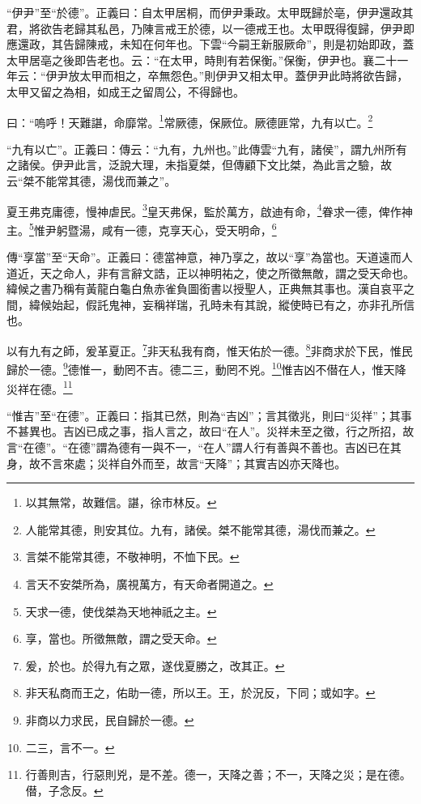 {\noindent\shu{}\fzkt “伊尹”至“於德”。正義曰：自太甲居桐，而伊尹秉政。太甲既歸於亳，伊尹還政其君，將欲告老歸其私邑，乃陳言戒王於德，以一德戒王也。太甲既得復歸，伊尹即應還政，其告歸陳戒，未知在何年也。下雲“今嗣王新服厥命”，則是初始即政，蓋太甲居亳之後即告老也。云：“在太甲，時則有若保衡。”保衡，伊尹也。襄二十一年云：“伊尹放太甲而相之，卒無怨色。”則伊尹又相太甲。蓋伊尹此時將欲告歸，太甲又留之為相，如成王之留周公，不得歸也。 \par}

曰：“嗚呼！天難諶，命靡常。\footnote{以其無常，故難信。諶，徐巿林反。}常厥德，保厥位。厥德匪常，九有以亡。\footnote{人能常其德，則安其位。九有，諸侯。桀不能常其德，湯伐而兼之。}

{\noindent\shu{}\fzkt “九有以亡”。正義曰：傳云：“九有，九州也。”此傳雲“九有，諸侯”，謂九州所有之諸侯。伊尹此言，泛說大理，未指夏桀，但傳顧下文比桀，為此言之驗，故云“桀不能常其德，湯伐而兼之”。 \par}

夏王弗克庸德，慢神虐民。\footnote{言桀不能常其德，不敬神明，不恤下民。}皇天弗保，監於萬方，啟迪有命，\footnote{言天不安桀所為，廣視萬方，有天命者開道之。}眷求一德，俾作神主。\footnote{天求一德，使伐桀為天地神祇之主。}惟尹躬暨湯，咸有一德，克享天心，受天明命，\footnote{享，當也。所徵無敵，謂之受天命。}

{\noindent\zhuan{}\fzbyks 傳“享當”至“天命”。正義曰：德當神意，神乃享之，故以“享”為當也。天道遠而人道近，天之命人，非有言辭文誥，正以神明祐之，使之所徵無敵，謂之受天命也。緯候之書乃稱有黃龍白龜白魚赤雀負圖銜書以授聖人，正典無其事也。漢自哀平之間，緯候始起，假託鬼神，妄稱祥瑞，孔時未有其說，縱使時已有之，亦非孔所信也。 \par}

以有九有之師，爰革夏正。\footnote{爰，於也。於得九有之眾，遂伐夏勝之，改其正。}非天私我有商，惟天佑於一德。\footnote{非天私商而王之，佑助一德，所以王。王，於況反，下同；或如字。}非商求於下民，惟民歸於一德。\footnote{非商以力求民，民自歸於一德。}德惟一，動罔不吉。德二三，動罔不兇。\footnote{二三，言不一。}惟吉凶不僣在人，惟天降災祥在德。\footnote{行善則吉，行惡則兇，是不差。德一，天降之善；不一，天降之災；是在德。僣，子念反。}

{\noindent\shu{}\fzkt “惟吉”至“在德”。正義曰：指其已然，則為“吉凶”；言其徵兆，則曰“災祥”；其事不甚異也。吉凶已成之事，指人言之，故曰“在人”。災祥未至之徵，行之所招，故言“在德”。“在德”謂為德有一與不一，“在人”謂人行有善與不善也。吉凶已在其身，故不言來處；災祥自外而至，故言“天降”；其實吉凶亦天降也。 \par}

